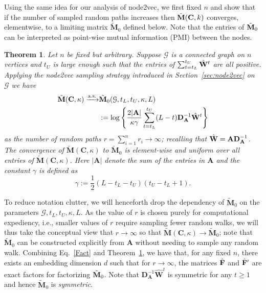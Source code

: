 \documentclass[10pt,journal,compsoc]{IEEEtran}
\newcommand{\ee}{\end{aligned} \end{equation}}
\newtheorem{theorem}{Theorem}
\newcommand{\bee}{\begin{equation}\begin{aligned}}
\newcommand{\M}[1]{{{\mathbf{\MakeUppercase{#1}}}}}
\numberwithin{equation}{section}
\begin{document}
{%
Using the same idea for our analysis of node2vec, we first fixed $n$
and show that if the number of sampled random paths increases then $\tilde{\M
  M}(\M C,k)$ converges, elementwise, to a limiting matrix
$\tilde{\mathbf{M}}_0$ defined below. Note that the entries of $\tilde{\M M}_0$ can be interpreted as 
point-wise mutual information (PMI) between the nodes. 
\begin{theorem}
\label{T1}
Let $n$ be fixed but arbitrary. Suppose $\mathcal{G}$ is a connected graph on $n$ vertices and $t_U$ is large enough such 
that the entries of $\sum_{t = t_L}^{t_U}\hat{\M W}^t$ are all
positive. Applying the node2vec sampling strategy introduced in Section~\ref{sec:node2vec} on $\mathcal{G}$ we have
\bee\label{T1:1}
\tilde{\M M}(\M C, \kappa) \xrightarrow{\text{a.s.}}& \tilde{\M M}_0(\mathcal{G},t_L,t_U,\kappa,L)
\\
&:= \log\Bigg\{\frac{2|\M A|}{\kappa \gamma }\sum_{t = t_L}^{t_U}(L - t)\M D_{\M A}^{-1}\hat{\M W}^t\Bigg\} 
\ee
as the number of random paths $r = \sum_{i = 1}^n r_i \rightarrow \infty$; recalling that $\hat{\M
  W} = \M A \M D_{\M A}^{-1}$. The convergence of $\tilde{\mathbf{M}}(\mathbf{C}, \kappa)$ to $\tilde{\mathbf{M}}_0$
is element-wise and uniform over all entries of
$\tilde{\mathbf{M}}(\mathbf{C}, \kappa)$. Here $|\mathbf{A}|$ denote the
sum of the entries in $\mathbf{A}$ and the constant $\gamma$ is defined as
$$\gamma := \frac{1}{2}(L - t_L - t_U)(t_U - t_L + 1).$$
\end{theorem}

To reduce notation clutter, we will henceforth drop the dependency of
$\tilde{\mathbf{M}}_0$ on the parameters
$\mathcal{G}, t_L, t_U, \kappa, L$. 
As the value of $r$ is chosen purely
for computational expediency, i.e., smaller values of $r$
require sampling fewer random walks, we will thus take the conceptual view that $r \rightarrow \infty$ so that $\tilde{\mathbf{M}}(\mathbf{C}, \kappa) \rightarrow \tilde{\mathbf{M}}_0$; note that $\tilde{\mathbf{M}}_0$ can be constructed explicitly from $\mathbf{A}$ without needing to sample any random walk. 
Combining Eq.~\eqref{Fact} and Theorem~\ref{T1}, we have that, for any 
fixed $n$, there exists an embedding dimension $d$ such that for $r\rightarrow \infty$, the matrices $\hat{\M F}$ and $\hat{\M F}'$ are
exact factors for factorizing $\tilde{\M
  M}_0$. 
 Note that $\mathbf{D}_{\mathbf{A}}^{-1}
\hat{\mathbf{W}}^{t}$ is symmetric for any $t \geq 1$ and hence $\tilde{\mathbf{M}}_0$ is {\em symmetric}. 

}
\end{document}
